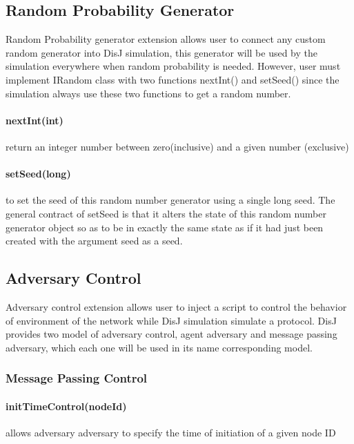 \subsection{Random Probability Generator}

Random Probability generator extension allows user to connect any custom random generator into DisJ simulation, this generator will be used by the simulation everywhere when random probability is needed. However, user must implement IRandom class with two functions nextInt() and setSeed() since the simulation always use these two functions to get a random number.


\paragraph{nextInt(int)} return an integer number between zero(inclusive) and a given number (exclusive)

\paragraph{setSeed(long)} to set the seed of this random number generator using a single long seed. The general contract of setSeed is that it alters the state of this random number generator object so as to be in exactly the same state as if it had just been created with the argument seed as a seed.


\subsection{Adversary Control}

Adversary control extension allows user to inject a script to control the behavior of environment of the network while DisJ simulation simulate a protocol. DisJ provides two model of adversary control, agent adversary and message passing adversary, which each one will be used in its name corresponding model.


\subsubsection*{Message Passing Control}


\paragraph{initTimeControl(nodeId)} allows adversary adversary to specify the time of initiation of a given node ID

